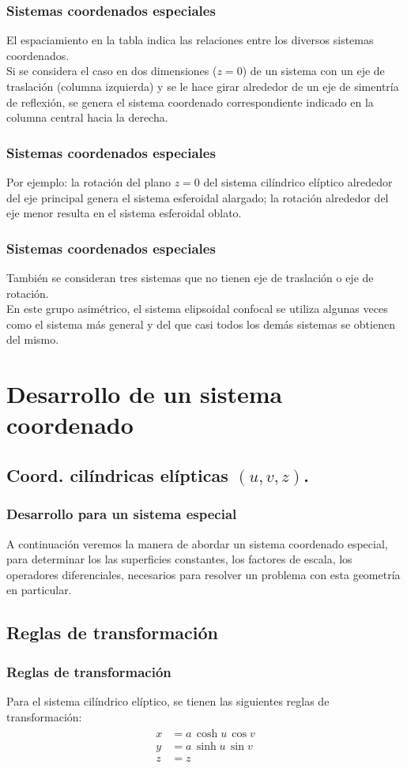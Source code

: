 \begin{frame}
\frametitle{Sistemas coordenados especiales}
El espaciamiento en la tabla indica las relaciones entre los diversos sistemas coordenados.
\\
\bigskip
Si se considera el caso en dos dimensiones ($z = 0$) de un sistema con un eje de traslación (columna izquierda) y se le hace girar alrededor de un eje de simentría de reflexión, se genera el sistema coordenado correspondiente indicado en la columna central hacia la derecha.
\end{frame}
\begin{frame}
\frametitle{Sistemas coordenados especiales}
Por ejemplo: la rotación del plano $z = 0$ del sistema cilíndrico elíptico alrededor del eje principal genera el sistema esferoidal alargado; la rotación alrededor del eje menor resulta en el sistema esferoidal oblato.
\end{frame}
\begin{frame}
\frametitle{Sistemas coordenados especiales}
También se consideran tres sistemas que no tienen eje de traslación o eje de rotación.
\\
\bigskip
En este grupo asimétrico, el sistema elipsoidal confocal se utiliza algunas veces como el sistema más general y del que casi todos los demás sistemas se obtienen del mismo.
\end{frame}
\section{Desarrollo de un sistema coordenado}
\subsection{Coord. cilíndricas elípticas \texorpdfstring{$(u, v, z)$}{(u, v, z)}.}
\begin{frame}
\frametitle{Desarrollo para un sistema especial}
A continuación veremos la manera de abordar un sistema coordenado especial, para determinar los las superficies constantes, los factores de escala, los operadores diferenciales, necesarios para resolver un problema con esta geometría en particular.
\end{frame}
\subsection{Reglas de transformación}
\begin{frame}
\frametitle{Reglas de transformación}
Para el sistema cilíndrico elíptico, se tienen las siguientes reglas de transformación:
\begin{align}
\begin{aligned}
x &= a \, \cosh u \, \cos v \\
y &= a \, \sinh u \, \sin v \\
z &= z
\end{aligned}
\label{eq:ecuacion_02_73_esp}
\end{align}
\end{frame}
